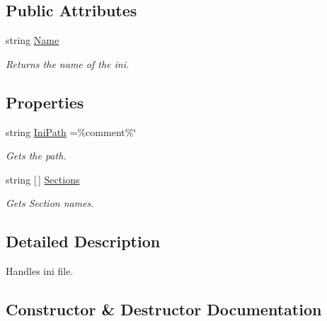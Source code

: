 \subsection*{Public Attributes}
\begin{DoxyCompactItemize}
\item 
string \mbox{\hyperlink{class_o_e_invaders_1_1_library_1_1_ini_parser_a5cd397eb978d0ba1837c84b908554598}{Name}}
\begin{DoxyCompactList}\small\item\em Returns the name of the ini. \end{DoxyCompactList}\end{DoxyCompactItemize}
\subsection*{Properties}
\begin{DoxyCompactItemize}
\item 
string \mbox{\hyperlink{class_o_e_invaders_1_1_library_1_1_ini_parser_af37c785f57abdee7714a86ad5c99bada}{Ini\+Path}} =\%comment\%\char`\"{}
\begin{DoxyCompactList}\small\item\em Gets the path. \end{DoxyCompactList}\item 
string \mbox{[}$\,$\mbox{]} \mbox{\hyperlink{class_o_e_invaders_1_1_library_1_1_ini_parser_a788f857e14a3ddea85abde9a8bb4e7cd}{Sections}}
\begin{DoxyCompactList}\small\item\em Gets Section names. \end{DoxyCompactList}\end{DoxyCompactItemize}


\subsection{Detailed Description}
Handles ini file. 



\subsection{Constructor \& Destructor Documentation}
\mbox{\label{class_o_e_invaders_1_1_library_1_1_ini_parser_a3356f9debddd4725729351af23441509}} 
